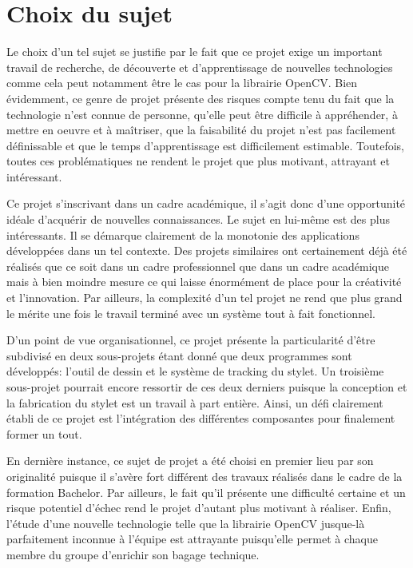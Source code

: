 \documentclass[11pt,a4paper,oldfontcommands]{memoir}
\begin{document}
\section{Choix du sujet}

Le choix d'un tel sujet se justifie par le fait que ce projet exige un important travail de recherche, de découverte et d'apprentissage de nouvelles technologies comme cela peut notamment être le cas pour la librairie OpenCV. Bien évidemment, ce genre de projet présente des risques compte tenu du fait que la technologie n'est connue de personne, qu'elle peut être difficile à appréhender, à mettre en oeuvre et à maîtriser, que la faisabilité du projet n'est pas facilement définissable et que le temps d'apprentissage est difficilement estimable. Toutefois, toutes ces problématiques ne rendent le projet que plus motivant, attrayant et intéressant. 

Ce projet s'inscrivant dans un cadre académique, il s'agit donc d'une opportunité idéale d'acquérir de nouvelles connaissances. Le sujet en lui-même est des plus intéressants. Il se démarque clairement de la monotonie des applications développées dans un tel contexte. Des projets similaires ont certainement déjà été réalisés que ce soit dans un cadre professionnel que dans un cadre académique mais à bien moindre mesure ce qui laisse énormément de place pour la créativité et l'innovation. Par ailleurs, la complexité d'un tel projet ne rend que plus grand le mérite une fois le travail terminé avec un système tout à fait fonctionnel.

D'un point de vue organisationnel, ce projet présente la particularité d'être subdivisé en deux sous-projets étant donné que deux programmes sont développés: l'outil de dessin et le système de tracking du stylet. Un troisième sous-projet pourrait encore ressortir de ces deux derniers puisque la conception et la fabrication du stylet est un travail à part entière. Ainsi, un défi clairement établi de ce projet est l'intégration des différentes composantes pour finalement former un tout.

En dernière instance, ce sujet de projet a été choisi en premier lieu par son originalité puisque il s'avère fort différent des travaux réalisés dans le cadre de la formation Bachelor. Par ailleurs, le fait qu'il présente une difficulté certaine et un risque potentiel d'échec rend le projet d'autant plus motivant à réaliser. Enfin, l'étude d'une nouvelle technologie telle que la librairie OpenCV jusque-là parfaitement inconnue à l'équipe est attrayante puisqu'elle permet à chaque membre du groupe d'enrichir son bagage technique.
\end{document}
